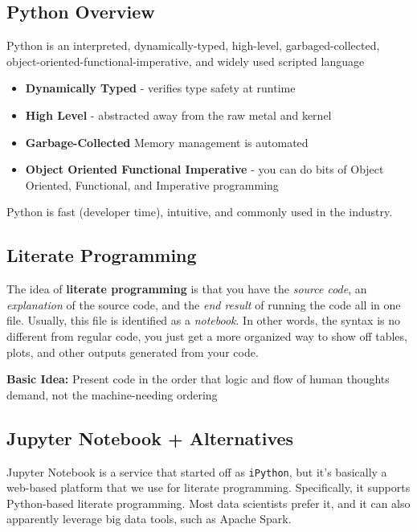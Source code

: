 \documentclass[english, 10pt]{article}
\begin{document}
\subsection{Python Overview}
Python is an interpreted, dynamically-typed, high-level, garbaged-collected, object-oriented-functional-imperative, and widely used scripted language
\begin{itemize}
	\item \textbf{Dynamically Typed} - verifies type safety at runtime
	\item \textbf{High Level} - abstracted away from the raw metal and kernel
	\item \textbf{Garbage-Collected} Memory management is automated
	\item \textbf{Object Oriented Functional Imperative } - you can do bits of Object Oriented, Functional, and Imperative programming
\end{itemize}
Python is fast (developer time), intuitive, and commonly used in the industry.

\subsection{Literate Programming}

The idea of \textbf{literate programming} is that you have the \textit{source code}, an \textit{explanation} of the source code, and the \textit{end result} of running the code all in one file. Usually, this file is identified as a \textit{notebook}. In other words, the syntax is no different from regular code, you just get a more organized way to show off tables, plots, and other outputs generated from your code.\newline

\textbf{Basic Idea:} Present code in the order that logic and flow of human thoughts demand, not the machine-needing ordering

\subsection{Jupyter Notebook + Alternatives}

Jupyter Notebook is a service that started off as \texttt{iPython}, but it's basically a web-based platform that we use for literate programming. Specifically, it supports Python-based literate programming. Most data scientists prefer it, and it can also apparently leverage big data tools, such as Apache Spark.\newline
\end{document}
